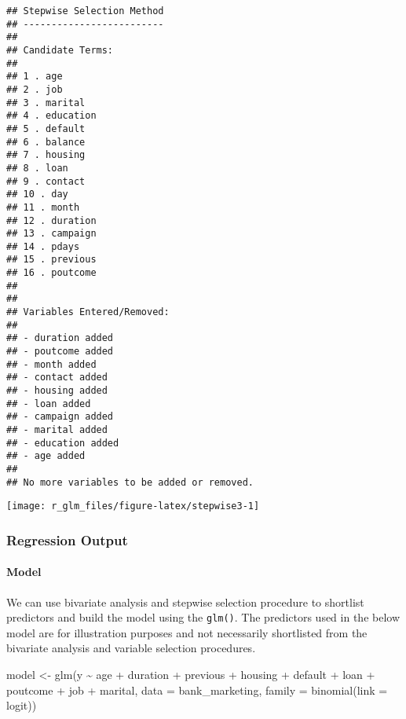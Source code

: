 \documentclass[
]{article}
\newenvironment{Shaded}{\begin{snugshade}}{\end{snugshade}}
\newcommand{\AttributeTok}[1]{\textcolor[rgb]{0.77,0.63,0.00}{#1}}
\newcommand{\FunctionTok}[1]{\textcolor[rgb]{0.00,0.00,0.00}{#1}}
\newcommand{\NormalTok}[1]{#1}
\newcommand{\OtherTok}[1]{\textcolor[rgb]{0.56,0.35,0.01}{#1}}
\newcommand{\SpecialCharTok}[1]{\textcolor[rgb]{0.00,0.00,0.00}{#1}}
\newcommand{\StringTok}[1]{\textcolor[rgb]{0.31,0.60,0.02}{#1}}
\begin{document}
\begin{verbatim}
## Stepwise Selection Method 
## -------------------------
## 
## Candidate Terms: 
## 
## 1 . age 
## 2 . job 
## 3 . marital 
## 4 . education 
## 5 . default 
## 6 . balance 
## 7 . housing 
## 8 . loan 
## 9 . contact 
## 10 . day 
## 11 . month 
## 12 . duration 
## 13 . campaign 
## 14 . pdays 
## 15 . previous 
## 16 . poutcome 
## 
## 
## Variables Entered/Removed: 
## 
## - duration added 
## - poutcome added 
## - month added 
## - contact added 
## - housing added 
## - loan added 
## - campaign added 
## - marital added 
## - education added 
## - age added 
## 
## No more variables to be added or removed.
\end{verbatim}

\begin{center}\texttt{[image: r\_glm\_files/figure-latex/stepwise3-1]} \end{center}

\hypertarget{regression-output}{%
\subsubsection{Regression Output}\label{regression-output}}

\hypertarget{model-1}{%
\paragraph{Model}\label{model-1}}

We can use bivariate analysis and stepwise selection procedure to
shortlist predictors and build the model using the \texttt{glm()}. The
predictors used in the below model are for illustration purposes and not
necessarily shortlisted from the bivariate analysis and variable
selection procedures.

\begin{Shaded}
\begin{Highlighting}[]
\NormalTok{model }\OtherTok{\textless{}{-}} \FunctionTok{glm}\NormalTok{(y }\SpecialCharTok{\textasciitilde{}}\NormalTok{  age }\SpecialCharTok{+}\NormalTok{ duration }\SpecialCharTok{+}\NormalTok{ previous }\SpecialCharTok{+}\NormalTok{ housing }\SpecialCharTok{+}\NormalTok{ default }\SpecialCharTok{+}
\NormalTok{             loan }\SpecialCharTok{+}\NormalTok{ poutcome }\SpecialCharTok{+}\NormalTok{ job }\SpecialCharTok{+}\NormalTok{ marital, }\AttributeTok{data =}\NormalTok{ bank\_marketing, }
             \AttributeTok{family =} \FunctionTok{binomial}\NormalTok{(}\AttributeTok{link =} \StringTok{\textquotesingle{}logit\textquotesingle{}}\NormalTok{))}
\end{Highlighting}
\end{Shaded}
\end{document}
